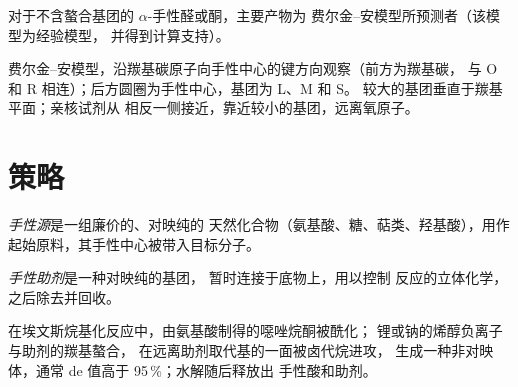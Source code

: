 \begin{proposition}\label{prop:b3:asymmetric-synthesis:felkin}
对于不含螯合基团的 $\alpha$-手性醛或酮，主要产物为
费尔金–安模型所预测者（该模型为经验模型，
并得到计算支持）。\admitted
\end{proposition}

\begin{omfigure}

{\small 费尔金–安模型，沿羰基碳原子向手性中心的键方向观察（前方为羰基碳，
与 O 和 R 相连）；后方圆圈为手性中心，基团为 L、M 和 S。
较大的基团垂直于羰基平面；亲核试剂从
相反一侧接近，靠近较小的基团，远离氧原子。}
\end{omfigure}

\section{策略}

\begin{definition}[手性源]\label{def:b3:asymmetric-synthesis:chiral-pool}
\emph{手性源}是一组廉价的、对映纯的
天然化合物（氨基酸、糖、萜类、羟基酸），用作
起始原料，其手性中心被带入目标分子。
\end{definition}

\begin{definition}[手性助剂]\label{def:b3:asymmetric-synthesis:auxiliary}
\emph{手性助剂}是一种对映纯的基团，
暂时连接于底物上，用以控制
反应的立体化学，之后除去并回收。
\end{definition}

在埃文斯烷基化反应中，由氨基酸制得的噁唑烷酮被酰化；
锂或钠的烯醇负离子与助剂的羰基螯合，
在远离助剂取代基的一面被卤代烷进攻，
生成一种非对映体，通常 de 值高于 95\,\%；水解随后释放出
手性酸和助剂。

